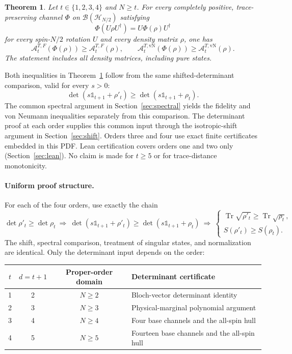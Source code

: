 \documentclass[11pt,a4paper]{article}
\newcommand{\A}{\mathcal A}
\newcommand{\Tr}{\operatorname{Tr}}
\newcommand{\id}{\mathds{1}}
\newtheorem{theorem}{Theorem}
\begin{document}
\begin{theorem}\label{thm:main}
Let $t\in\{1,2,3,4\}$ and $N\ge t$. For every completely positive,
trace-preserving channel $\Phi$ on $\mathcal B(\mathcal H_{N/2})$
satisfying
\[
 \Phi(U\rho U^\dagger)=U\Phi(\rho)U^\dagger
\]
for every spin-$N/2$ rotation $U$ and every density matrix $\rho$,
one has
\[
 \boxed{\A_t^{T,F}(\Phi(\rho))\ge\A_t^{T,F}(\rho),\qquad
 \A_t^{T,\mathrm{vN}}(\Phi(\rho))\ge\A_t^{T,\mathrm{vN}}(\rho).}
\]
The statement includes all density matrices, including pure states.
\end{theorem}

Both inequalities in Theorem~\ref{thm:main} follow from the same
shifted-determinant comparison, valid for every $s>0$:
\[
 \det(s\id_{t+1}+\rho'_t)\ge\det(s\id_{t+1}+\rho_t).
\]
The common spectral argument in Section~\ref{sec:spectral} yields
the fidelity and von Neumann inequalities separately from this comparison.
The determinant proof at each order supplies this common input through
the isotropic-shift argument in Section~\ref{sec:shift}.
Orders three and four use exact finite
certificates embedded in this PDF. Lean certification covers orders one
and two only (Section~\ref{sec:lean}). No claim is made for $t\ge5$
or for trace-distance monotonicity.

\paragraph{Uniform proof structure.}
For each of the four orders, use exactly the chain
\[
 \det\rho'_t\ge\det\rho_t
 \ \Longrightarrow\
 \det(s\id_{t+1}+\rho'_t)\ge\det(s\id_{t+1}+\rho_t)
 \ \Longrightarrow\
 \begin{cases}
 \Tr\sqrt{\rho'_t}\ge\Tr\sqrt{\rho_t},\\
 S(\rho'_t)\ge S(\rho_t).
 \end{cases}
\]
The shift, spectral comparison, treatment of singular states, and
normalization are identical. Only the determinant input depends on the order:
\begin{center}
\begin{tabular}{@{}cccl@{}}
\toprule
$t$&$d=t+1$&Proper-order domain&Determinant certificate\\
\midrule
1&2&$N\ge2$&Bloch-vector determinant identity\\
2&3&$N\ge3$&Physical-marginal polynomial argument\\
3&4&$N\ge4$&Four base channels and the all-spin hull\\
4&5&$N\ge5$&Fourteen base channels and the all-spin hull\\
\bottomrule
\end{tabular}
\end{center}
\end{document}
